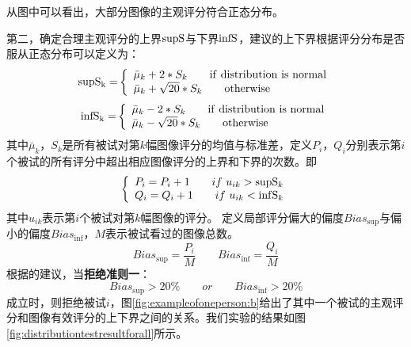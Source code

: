 从图中可以看出，大部分图像的主观评分符合正态分布。

第二，确定合理主观评分的上界${\rm{supS}}$与下界${\rm{infS}}$，\parencite{recommendation2002500}建议的上下界根据评分分布是否服从正态分布可以定义为：
\begin{equation}
{\rm{supS_k = }}\left\{ \begin{array}{l}
{{\bar \mu }_k} + 2*{S_k}{\rm{\qquad              if\  distribution\  is\  normal}}\\
{{\bar \mu }_k} + \sqrt {20} *{S_k}{\rm{\qquad         otherwise}}
\end{array} \right.
\end{equation}
\begin{equation}
{\rm{infS_k = }}\left\{ \begin{array}{l}
{{\bar \mu }_k} - 2*{S_k}{\rm{\qquad              if\  distribution\  is\  normal}}\\
{{\bar \mu }_k} - \sqrt {20} *{S_k}{\rm{\qquad          otherwise}}
\end{array} \right.
\end{equation}
其中${{\bar \mu }_k} $，${S_k}$是所有被试对第$k$幅图像评分的均值与标准差，定义$P_i$，$Q_i$分别表示第$i$个被试的所有评分中超出相应图像评分的上界和下界的次数。即
\begin{equation}
\left\{ \begin{array}{l}
{P_i} = {P_i} + 1{\qquad if\ {u_{ik}} > {\rm{sup}}{{\rm{S}}_k}}\\
{Q_i} = {Q_i} + 1{\qquad if\ {u_{ik}} < {\rm{inf}}{{\rm{S}}_k}}
\end{array} \right.
\end{equation}
其中${u_{ik}}$表示第$i$个被试对第$k$幅图像的评分。
定义局部评分偏大的偏度$Bia{s_{\sup }} $与偏小的偏度$Bia{s_{\inf }}$，$M$表示被试看过的图像总数。
\begin{equation}
Bia{s_{\sup }} = \frac{{{P_i}}}{M} \qquad Bia{s_{\inf }} = \frac{{{Q_i}}}{M}
\end{equation}
根据\parencite{recommendation2002500}的建议，当\textbf{拒绝准则一}：
\begin{equation}
\label{eq:reject1}
Bia{s_{\sup }} > 20\%  \qquad or \qquad Bia{s_{\inf }} > 20\% 
\end{equation}
成立时，则拒绝被试$i$，图\ref{fig:exampleofoneperson:b}给出了其中一个被试的主观评分和图像有效评分的上下界之间的关系。我们实验的结果如图\ref{fig:distributiontestresultforall}所示。
